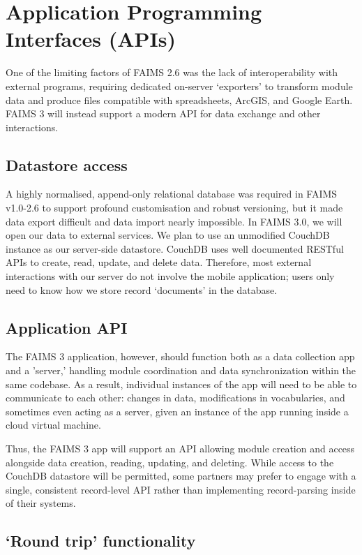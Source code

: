 \documentclass{faims3_report}
\begin{document}
\section{Application Programming Interfaces
(APIs)}

One of the limiting factors of FAIMS 2.6 was the lack of
interoperability with external programs, requiring dedicated on-server
`exporters' to transform module data and produce files compatible with
spreadsheets, ArcGIS, and Google Earth. FAIMS 3 will instead support a
modern API for data exchange and other interactions.

\subsection{Datastore access}

A highly normalised, append-only relational database was required in
FAIMS v1.0-2.6 to support profound customisation and robust versioning,
but it made data export difficult and data import nearly impossible. In
FAIMS 3.0, we will open our data to external services. We plan to use an
unmodified CouchDB instance as our server-side datastore. CouchDB uses
well documented RESTful APIs to create, read, update, and delete data.
Therefore, most external interactions with our server do not involve the
mobile application; users only need to know how we store record
`documents' in the database.

\subsection{Application API}

The FAIMS 3 application, however, should function both as a data
collection app and a 'server,' handling module coordination and data
synchronization within the same codebase. As a result, individual
instances of the app will need to be able to communicate to each other:
changes in data, modifications in vocabularies, and sometimes even
acting as a server, given an instance of the app running inside a cloud
virtual machine.

Thus, the FAIMS 3 app will support an API allowing module creation and
access alongside data creation, reading, updating, and deleting. While
access to the CouchDB datastore will be permitted, some partners may
prefer to engage with a single, consistent record-level API rather than
implementing record-parsing inside of their systems.

\subsection{`Round trip' functionality
}
\end{document}
